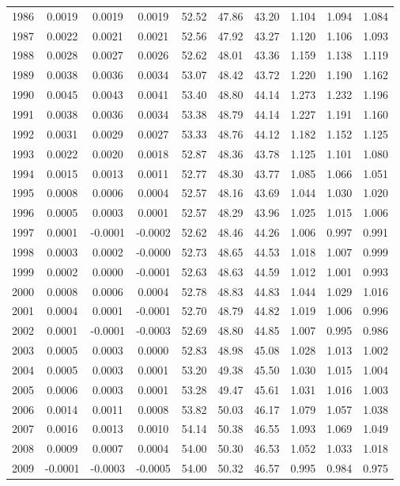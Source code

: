 \begin{tabular}{cccccccccc}
  1986 & 0.0019 & 0.0019 & 0.0019 & 52.52 & 47.86 & 43.20 & 1.104 & 1.094 & 1.084 \\ 
  1987 & 0.0022 & 0.0021 & 0.0021 & 52.56 & 47.92 & 43.27 & 1.120 & 1.106 & 1.093 \\ 
  1988 & 0.0028 & 0.0027 & 0.0026 & 52.62 & 48.01 & 43.36 & 1.159 & 1.138 & 1.119 \\ 
  1989 & 0.0038 & 0.0036 & 0.0034 & 53.07 & 48.42 & 43.72 & 1.220 & 1.190 & 1.162 \\ 
  1990 & 0.0045 & 0.0043 & 0.0041 & 53.40 & 48.80 & 44.14 & 1.273 & 1.232 & 1.196 \\ 
  1991 & 0.0038 & 0.0036 & 0.0034 & 53.38 & 48.79 & 44.14 & 1.227 & 1.191 & 1.160 \\ 
  1992 & 0.0031 & 0.0029 & 0.0027 & 53.33 & 48.76 & 44.12 & 1.182 & 1.152 & 1.125 \\ 
  1993 & 0.0022 & 0.0020 & 0.0018 & 52.87 & 48.36 & 43.78 & 1.125 & 1.101 & 1.080 \\ 
  1994 & 0.0015 & 0.0013 & 0.0011 & 52.77 & 48.30 & 43.77 & 1.085 & 1.066 & 1.051 \\ 
  1995 & 0.0008 & 0.0006 & 0.0004 & 52.57 & 48.16 & 43.69 & 1.044 & 1.030 & 1.020 \\ 
  1996 & 0.0005 & 0.0003 & 0.0001 & 52.57 & 48.29 & 43.96 & 1.025 & 1.015 & 1.006 \\ 
  1997 & 0.0001 & -0.0001 & -0.0002 & 52.62 & 48.46 & 44.26 & 1.006 & 0.997 & 0.991 \\ 
  1998 & 0.0003 & 0.0002 & -0.0000 & 52.73 & 48.65 & 44.53 & 1.018 & 1.007 & 0.999 \\ 
  1999 & 0.0002 & 0.0000 & -0.0001 & 52.63 & 48.63 & 44.59 & 1.012 & 1.001 & 0.993 \\ 
  2000 & 0.0008 & 0.0006 & 0.0004 & 52.78 & 48.83 & 44.83 & 1.044 & 1.029 & 1.016 \\ 
  2001 & 0.0004 & 0.0001 & -0.0001 & 52.70 & 48.79 & 44.82 & 1.019 & 1.006 & 0.996 \\ 
  2002 & 0.0001 & -0.0001 & -0.0003 & 52.69 & 48.80 & 44.85 & 1.007 & 0.995 & 0.986 \\ 
  2003 & 0.0005 & 0.0003 & 0.0000 & 52.83 & 48.98 & 45.08 & 1.028 & 1.013 & 1.002 \\ 
  2004 & 0.0005 & 0.0003 & 0.0001 & 53.20 & 49.38 & 45.50 & 1.030 & 1.015 & 1.004 \\ 
  2005 & 0.0006 & 0.0003 & 0.0001 & 53.28 & 49.47 & 45.61 & 1.031 & 1.016 & 1.003 \\ 
  2006 & 0.0014 & 0.0011 & 0.0008 & 53.82 & 50.03 & 46.17 & 1.079 & 1.057 & 1.038 \\ 
  2007 & 0.0016 & 0.0013 & 0.0010 & 54.14 & 50.38 & 46.55 & 1.093 & 1.069 & 1.049 \\ 
  2008 & 0.0009 & 0.0007 & 0.0004 & 54.00 & 50.30 & 46.53 & 1.052 & 1.033 & 1.018 \\ 
  2009 & -0.0001 & -0.0003 & -0.0005 & 54.00 & 50.32 & 46.57 & 0.995 & 0.984 & 0.975 \\ 
   \hline
\end{tabular}
